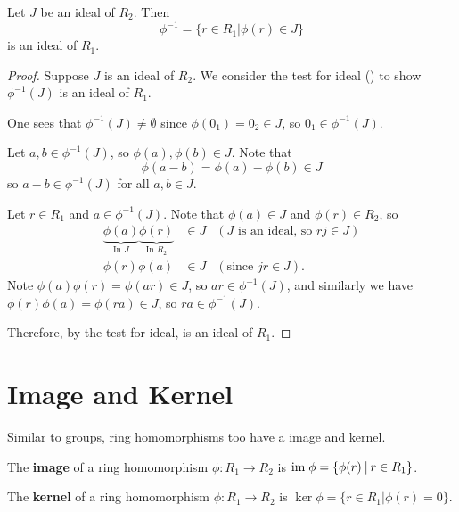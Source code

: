 \begin{proposition}\label{prop-inverse-homomorphism-on-ideal-is-ideal}
    Let $J$ be an ideal of $R_2$. Then
    \[
        \phi^{-1} = \{r \in R_1 \vert \phi(r) \in J\}
    \]
    is an ideal of $R_1$.
\end{proposition}
\begin{proof}
    Suppose $J$ is an ideal of $R_2$. We consider the test for ideal () to show $\phi^{-1}(J)$ is an ideal of $R_1$.
    
    One sees that $\phi^{-1}(J) \neq \emptyset$ since $\phi(0_1) = 0_2 \in J$, so $0_1 \in \phi^{-1}(J)$.

    Let $a, b \in \phi^{-1}(J)$, so $\phi(a), \phi(b) \in J$. Note that
    \[
        \phi(a-b) = \phi(a) - \phi(b) \in J
    \]
    so $a-b \in \phi^{-1}(J)$ for all $a,b \in J$.

    Let $r \in R_1$ and $a \in \phi^{-1}(J)$. Note that $\phi(a) \in J$ and $\phi(r) \in R_2$, so
    \begin{align*}
        \underbrace{\phi(a)}_{\text{In }J}\underbrace{\phi(r)}_{\text{In }R_2} &\in J & (J\text{ is an ideal, so } rj \in J)\\
        \phi(r)\phi(a) &\in J & (\text{since } jr \in J).
    \end{align*}
    Note $\phi(a)\phi(r) = \phi(ar) \in J$, so $ar \in \phi^{-1}(J)$, and similarly we have $\phi(r)\phi(a) = \phi(ra) \in J$, so $ra \in \phi^{-1}(J)$.

    Therefore, by the test for ideal, is an ideal of $R_1$.
\end{proof}

\section{Image and Kernel}
Similar to groups, ring homomorphisms too have a image and kernel.
\begin{definition}
    The \textbf{image} of a ring homomorphism $\phi: R_1 \to R_2$ is $\im\phi = \{\phi(r) \vert r \in R_1\}$.
\end{definition}
\begin{definition}
    The \textbf{kernel} of a ring homomorphism $\phi:R_1 \to R_2$ is $\ker\phi = \{r \in R_1 \vert \phi(r) = 0\}$.
\end{definition}

